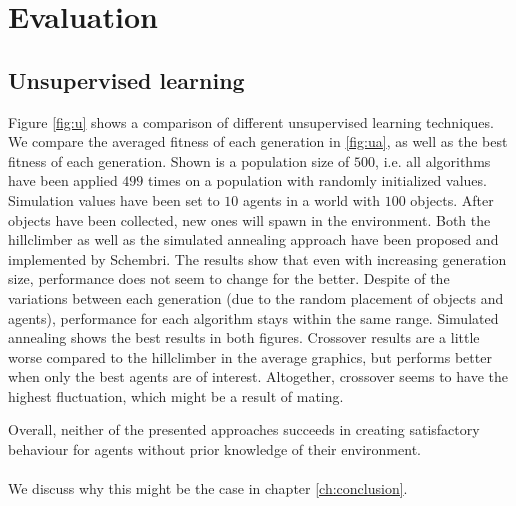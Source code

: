 \documentclass[10pt,a4paper,DIV=11]{scrreprt}
\begin{document}
\chapter{Evaluation}
\label{ch:eval}
\section{Unsupervised learning}

Figure \ref{fig:u} shows a comparison of different unsupervised learning techniques. We compare the averaged fitness of each generation in
\ref{fig:ua}, as well as the best fitness of each generation. Shown is a population size of $500$, i.e. all algorithms have been applied $499$ times
on a population with randomly initialized values. Simulation values have been set to $10$ agents in a world with $100$ objects. After objects have
been collected, new ones will spawn in the environment. Both the hillclimber as well as the simulated annealing 
approach have been proposed and implemented by Schembri. The results show that even with increasing generation size, performance does not seem to 
change for the better. Despite of the variations between each generation (due to the random placement of objects and agents), performance for each
algorithm stays within the same range. Simulated annealing shows the best results in both figures. Crossover results are a little worse compared to
the hillclimber in the average graphics, but performs better when only the best agents are of interest. Altogether, crossover seems to have the 
highest fluctuation, which might be a result of mating.


Overall, neither of the presented approaches succeeds in creating satisfactory behaviour for agents without prior knowledge of their environment.
\\
\\We discuss why this might be the case in chapter \ref{ch:conclusion}. 
\end{document}
